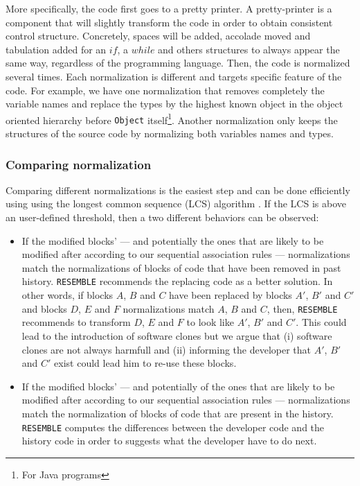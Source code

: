 More specifically, the code first goes to a pretty printer. A pretty-printer is a component that will slightly transform the code in order to obtain consistent control structure.
Concretely, spaces will be added, accolade moved and tabulation added for an $if$, a $while$ and others structures to always appear the same way, regardless of the programming language.
Then, the code is normalized several times. Each normalization is different and targets specific feature of the code.
For example, we have one normalization that removes completely the variable names and replace the types by the highest known object in the object oriented hierarchy before {\tt Object} itself\footnote{For Java programs}. Another normalization only keeps the structures of the source code by normalizing both variables names and types.

\subsubsection{Comparing normalization\label{sec:resemble-comparing}}

Comparing different normalizations is the easiest step and can be done efficiently using using the longest common sequence (LCS) algorithm \cite{hirschberg1977algorithms}.
If the LCS is above an user-defined threshold, then a two different behaviors can be observed:

\begin{itemize}
	\item If the modified blocks' --- and potentially the ones that are likely to be modified after according to our sequential association rules --- normalizations match the normalizations of blocks of code that have been removed in past history. {\tt RESEMBLE} recommends the replacing code as a better solution.
  In other words, if blocks $A$, $B$ and $C$ have been replaced by blocks $A'$, $B'$ and $C'$ and blocks $D$, $E$ and $F$ normalizations match $A$, $B$ and $C$, then, {\tt RESEMBLE} recommends to transform $D$, $E$ and $F$ to look like $A'$, $B'$ and $C'$. This could lead to the introduction of software clones but we argue that (i) software clones are not always harmfull \cite{Juergens2009} and (ii) informing the developer that $A'$, $B'$ and $C'$ exist could lead him to re-use these blocks.
	\item If the modified blocks' --- and potentially of the ones that are likely to be modified after according to our sequential association rules --- normalizations match the normalization of blocks of code that are present in the history. {\tt RESEMBLE} computes the differences between the developer code and the history code in order to suggests what the developer have to do next.
\end{itemize}


